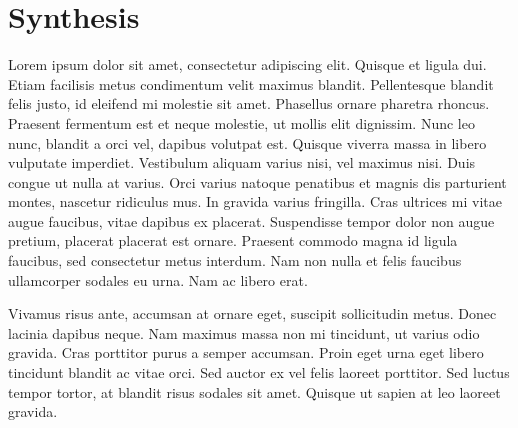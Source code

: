 \chapter{Synthesis}
\label{C06}

Lorem ipsum dolor sit amet, consectetur adipiscing elit. Quisque et ligula dui. Etiam facilisis metus condimentum velit maximus blandit. Pellentesque blandit felis justo, id eleifend mi molestie sit amet. Phasellus ornare pharetra rhoncus. Praesent fermentum est et neque molestie, ut mollis elit dignissim. Nunc leo nunc, blandit a orci vel, dapibus volutpat est. Quisque viverra massa in libero vulputate imperdiet. Vestibulum aliquam varius nisi, vel maximus nisi. Duis congue ut nulla at varius. Orci varius natoque penatibus et magnis dis parturient montes, nascetur ridiculus mus. In gravida varius fringilla. Cras ultrices mi vitae augue faucibus, vitae dapibus ex placerat. Suspendisse tempor dolor non augue pretium, placerat placerat est ornare. Praesent commodo magna id ligula faucibus, sed consectetur metus interdum. Nam non nulla et felis faucibus ullamcorper sodales eu urna. Nam ac libero erat.

Vivamus risus ante, accumsan at ornare eget, suscipit sollicitudin metus. Donec lacinia dapibus neque. Nam maximus massa non mi tincidunt, ut varius odio gravida. Cras porttitor purus a semper accumsan. Proin eget urna eget libero tincidunt blandit ac vitae orci. Sed auctor ex vel felis laoreet porttitor. Sed luctus tempor tortor, at blandit risus sodales sit amet. Quisque ut sapien at leo laoreet gravida. 

\clearpage
%

%  
